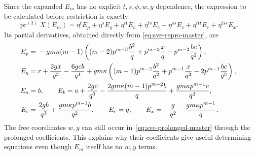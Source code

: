 \documentclass[11pt]{article}
\theoremstyle{definition}
\newcommand{\pr}{\operatorname{pr}}
\begin{document}
Since the expanded $E_m$ has no explicit $t,s,\phi,w,y$ dependence, the
expression to be calculated before restriction is exactly
\begin{equation}
 \pr^{(3)}X(E_m)=\eta^t E_p+\eta^s E_q+\eta^{tt}E_a
       +\eta^{ts}E_b+\eta^{ss}E_c+\eta^{ttt}E_r+\eta^{tss}E_x.
 \label{eq:sve-prolonged-master}
\end{equation}
Its partial derivatives, obtained directly from
\eqref{eq:sve-repro-master}, are
\begin{align}
 E_p={}&-gm\kappa(m-1)\left((m-2)p^{m-3}\frac{b^2}{q}
               +p^{m-2}\frac{x}{q}-p^{m-2}\frac{bc}{q^2}\right),\notag\\
 E_q={}&r+\frac{2gx}{q^3}-\frac{6gcb}{q^4}
       +gm\kappa\left((m-1)p^{m-2}\frac{b^2}{q^2}
           +p^{m-1}\frac{x}{q^2}-2p^{m-1}\frac{bc}{q^3}\right),\notag\\
 E_a={}&b,\qquad
 E_b=a+\frac{2gc}{q^3}-\frac{2gm\kappa(m-1)p^{m-2}b}{q}
                         +\frac{gm\kappa p^{m-1}c}{q^2},\notag\\
 E_c={}&\frac{2gb}{q^3}+\frac{gm\kappa p^{m-1}b}{q^2},\qquad
 E_r=q,\qquad E_x=-\frac{g}{q^2}-\frac{gm\kappa p^{m-1}}q.
 \label{eq:sve-master-partials}
\end{align}
The free coordinates $w,y$ can still occur in~\eqref{eq:sve-prolonged-master}
through the prolonged coefficients. This explains why their coefficients
give useful determining equations even though $E_m$ itself has no $w,y$ terms.
\end{document}
